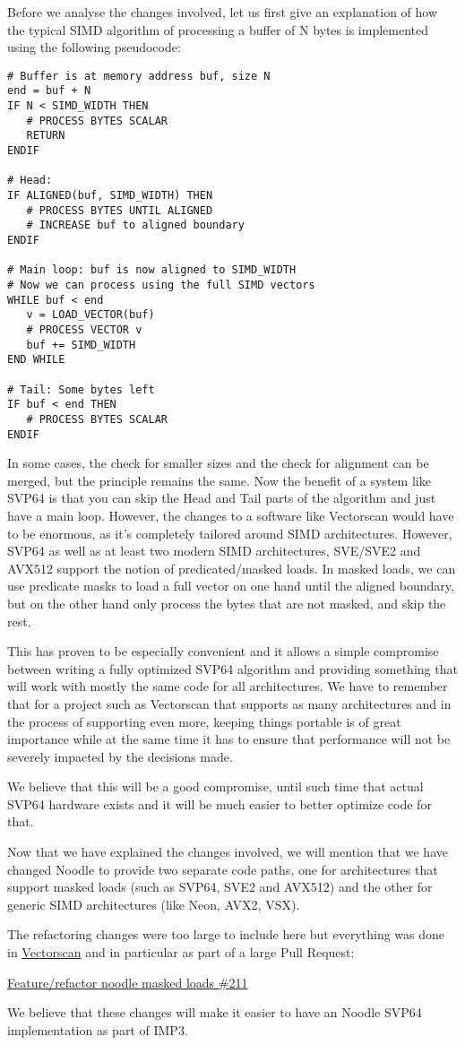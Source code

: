 Before we analyse the changes involved, let us first give an explanation of how the typical SIMD algorithm of processing a buffer of N bytes is implemented using the following pseudocode:

\begin{verbatim}
# Buffer is at memory address buf, size N
end = buf + N
IF N < SIMD_WIDTH THEN
   # PROCESS BYTES SCALAR
   RETURN
ENDIF

# Head:
IF ALIGNED(buf, SIMD_WIDTH) THEN
   # PROCESS BYTES UNTIL ALIGNED
   # INCREASE buf to aligned boundary
ENDIF

# Main loop: buf is now aligned to SIMD_WIDTH
# Now we can process using the full SIMD vectors
WHILE buf < end
   v = LOAD_VECTOR(buf)
   # PROCESS VECTOR v
   buf += SIMD_WIDTH
END WHILE

# Tail: Some bytes left
IF buf < end THEN
   # PROCESS BYTES SCALAR
ENDIF
\end{verbatim}

In some cases, the check for smaller sizes and the check for alignment can be merged, but the principle remains the same.
Now the benefit of a system like SVP64 is that you can skip the Head and Tail parts of the algorithm and just have a main loop.
However, the changes to a software like Vectorscan would have to be enormous, as it's completely tailored around SIMD architectures.
However, SVP64 as well as at least two modern SIMD architectures, SVE/SVE2 and AVX512 support the notion of predicated/masked loads.
In masked loads, we can use predicate masks to load a full vector on one hand until the aligned boundary, but on the other hand only process the bytes that are not masked, and skip the rest.

This has proven to be especially convenient and it allows a simple compromise between writing a fully optimized SVP64 algorithm and providing something that will work with mostly the same code for all architectures.
We have to remember that for a project such as Vectorscan that supports as many architectures and in the process of supporting even more, keeping things portable is of great importance while at the same time it has to ensure that performance will not be severely impacted by the decisions made.

We believe that this will be a good compromise, until such time that actual SVP64 hardware exists and it will be much easier to better optimize code for that.

Now that we have explained the changes involved, we will mention that we have changed Noodle to provide two separate code paths, one for architectures that support masked loads (such as SVP64, SVE2 and AVX512) and the other for generic SIMD architectures (like Neon, AVX2, VSX).

The refactoring changes were too large to include here but everything was done in \href{https://github.com/VectorCamp/vectorscan}{Vectorscan} and in particular as part of a large Pull Request:

\href{https://github.com/VectorCamp/vectorscan/pull/211}{Feature/refactor noodle masked loads \#211}

We believe that these changes will make it easier to have an Noodle SVP64 implementation as part of IMP3.

\clearpage
